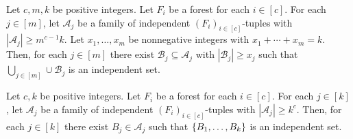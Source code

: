 \documentclass{patmorin}
\newcommand{\pat}[1]{\textcolor{Blue}{[Pat: #1]}}
\newcommand{\piotr}[1]{\textcolor{red}{Piotr: #1}}
\DeclarePairedDelimiter\set{\{}{\}}
\begin{document}
\begin{lem}
Let $c,m,k$ be positive integers. 
Let $F_i$ be a forest for each $i\in[c]$.
For each $j\in [m]$, 
let $\mathcal{A}_j$ be a family of independent $(F_i)_{i\in[c]}$-tuples with $|\mathcal{A}_j|\geq m^{c-1}k$. 
Let $x_1,\ldots,x_m$ be nonnegative integers with $x_1+\cdots+x_m=k$. 
Then, for each $j\in[m]$ there exist
$\mathcal{B}_j \subseteq \mathcal{A}_j$  
with $|\mathcal{B}_j|\geq x_j$ such that 
$\bigcup_{j\in[m]}\cup \mathcal{B}_j$ is an independent set. 
\end{lem}
\begin{cor}
\label{cor:interface-for-systems-lemma}
Let $c,k$ be positive integers. 
Let $F_i$ be a forest for each $i\in[c]$.
For each $j\in [k]$, 
let $\mathcal{A}_j$ be a family of independent $(F_i)_{i\in[c]}$-tuples with $|\mathcal{A}_j|\geq k^c$. 
Then, for each $j\in[k]$ there exist
$B_j \in \mathcal{A}_j$ such that 
$\set{B_1,\ldots,B_k}$ is an independent set.
\end{cor}
\end{document}
